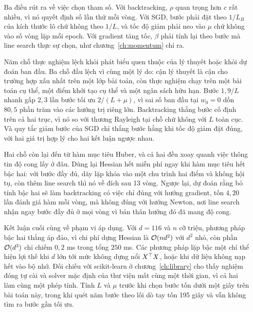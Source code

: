 \documentclass[12pt, a4paper, oneside]{report}
\theoremstyle{definition}
\begin{document}
Ba điều rút ra về việc chọn tham số. Với backtracking, $\rho$ quan trọng hơn $c$
rất nhiều, vì nó quyết định số lần thử mỗi vòng. Với SGD, bước phải đặt theo
$1/L_{B}$ của kích thước lô chứ không theo $1/L$, và tốc độ giảm phải neo vào
$\mu$ chứ không vào số vòng lặp mỗi epoch. Với gradient tăng tốc, $\beta$ phải
tính lại theo bước mà line search thực sự chọn, như chương~\ref{ch:momentum} chỉ
ra.

Năm chỗ thực nghiệm lệch khỏi phát biểu quen thuộc của lý thuyết hoặc khỏi dự đoán
ban đầu. Ba chỗ đầu lệch vì cùng một lý do: cận lý thuyết là cận cho trường hợp
xấu nhất trên một lớp bài toán, còn thực nghiệm chạy trên một bài toán cụ thể, một
điểm khởi tạo cụ thể và một ngân sách hữu hạn. Bước $1{,}9/L$ nhanh gấp $2{,}3$ lần bước tối ưu
$2/(L+\mu)$, vì sai số ban đầu tại $w_{0} = 0$ dồn $80{,}5$ phần trăm vào các
hướng trị riêng lớn. Backtracking thắng bước cố định trên cả hai trục, vì nó so
với thương Rayleigh tại chỗ chứ không với $L$ toàn cục. Và quy tắc giảm bước của
SGD chỉ thắng bước hằng khi tốc độ giảm đặt đúng, với hai giá trị hợp lý cho hai
kết luận ngược nhau.

Hai chỗ còn lại đến từ hàm mục tiêu Huber, và cả hai đều xoay quanh việc thông tin
độ cong lấy ở đâu. Dùng lại Hessian hết miễn phí ngay khi hàm mục tiêu hết bậc
hai: với bước đầy đủ, dãy lặp khóa vào một chu trình hai điểm và không hội tụ, còn
thêm line search thì nó về đích sau 13 vòng. Ngược lại, dự đoán rằng bỏ tính bậc
hai sẽ làm backtracking có việc chỉ đúng với hướng gradient, tốn $4{,}20$ lần đánh
giá hàm mỗi vòng, mà không đúng với hướng Newton, nơi line search nhận ngay bước
đầy đủ ở mọi vòng vì bản thân hướng đó đã mang độ cong.

Kết luận cuối cùng về phạm vi áp dụng. Với $d = 116$ và $n$ cỡ triệu, phương pháp
bậc hai thắng áp đảo, vì chi phí dựng Hessian là $\mathcal{O}(nd^{2})$ với $d^{2}$ nhỏ,
còn phần $\mathcal{O}(d^{3})$ chỉ chiếm $0{,}2$ ms trong tổng $250$ ms. Các phương pháp
lặp bậc một chỉ thể hiện lợi thế khi $d$ lớn tới mức không dựng nổi $X^{\top} X$,
hoặc khi dữ liệu không nạp hết vào bộ nhớ. Đối chiếu với scikit-learn ở chương~\ref{ch:library} cho thấy nghiệm đóng tự cài
và solver mặc định của thư viện mất cùng một thời gian, vì cả hai làm cùng một
phép tính. Tính $L$ và $\mu$ trước khi chọn bước tốn dưới một giây trên bài toán
này, trong khi quét năm bước theo lối dò tay
tốn 195 giây và vẫn không tìm ra bước gần tối ưu.

\printbibliography[heading=bibintoc, title={Tài liệu tham khảo}]
\end{document}
